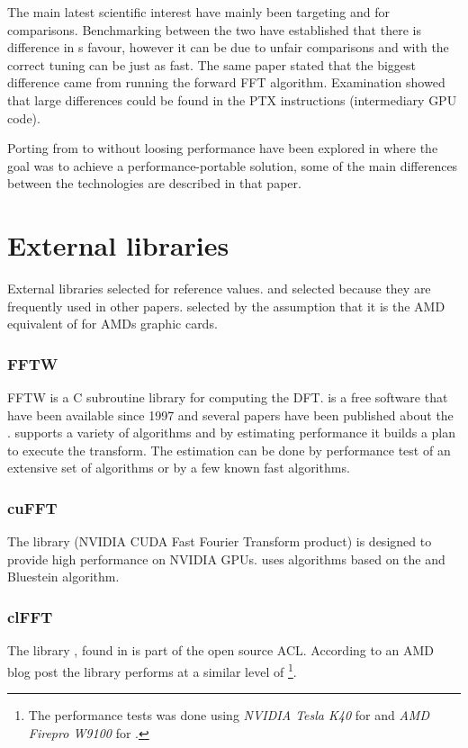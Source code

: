 The main latest scientific interest have mainly been targeting {\CU} and {\OCL} for comparisons. Benchmarking between the two have established that there is difference in {\CU}s favour, however it can be due to unfair comparisons\cite{fang2011comprehensive} and with the correct tuning {\OCL} can be just as fast. The same paper stated that the biggest difference came from running the forward \gls{FFT} algorithm. Examination showed that large differences could be found in the \gls{PTX} instructions (intermediary \gls{GPU} code).

Porting from {\CU} to {\OCL} without loosing performance have been explored in \cite{du2012cuda} where the goal was to achieve a performance-portable solution, some of the main differences between the technologies are described in that paper.

\section{External libraries}

External libraries selected for reference values. {\FFTW} and {\CUFFT} selected because they are frequently used in other papers. {\CLFFT} selected by the assumption that it is the AMD equivalent of {\CUFFT} for AMDs graphic cards.

\subsubsection{FFTW}

\gls{FFTW} is a C subroutine library for computing the \gls{DFT}. {\FFTW} is a free software\cite{fftw2015} that have been available since 1997 and several papers have been published about the {\FFTW}\cite{frigo1999fast,frigo1998fftw,frigo2005design}. {\FFTW} supports a variety of algorithms and by estimating performance it builds a plan to execute the transform. The estimation can be done by performance test of an extensive set of algorithms or by a few known fast algorithms.

\subsubsection{cuFFT}

The library {\CUFFT} (NVIDIA CUDA Fast Fourier Transform product)\cite{nvidia2013userguide} is designed to provide high performance on NVIDIA \gls{GPU}s. {\CUFFT} uses algorithms based on the {\CTALG} and Bluestein algorithm\cite{bluestein1970linear}.

\subsubsection{clFFT}

The library {\CLFFT}, found in\cite{githubclfft} is part of the open source \gls{ACL}\cite{amdacl}. According to an AMD blog post\cite{amd2015performance} the library performs at a similar level of {\CUFFT}\footnote{The performance tests was done using \emph{NVIDIA Tesla K40} for {\CUFFT} and \emph{AMD Firepro W9100} for {\CLFFT}.}.